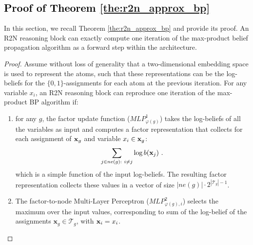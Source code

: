 \documentclass[journal]{IEEEtran}
\newcommand{\mc}{\mathcal}
\newcommand{\ar}[1]{\textcolor{black}{#1}}
\newenvironment{appxthm}[1]
  {\renewcommand\theinnercustomthm{#1}\innercustomthm}
  {\endinnercustomthm}
\begin{document}
\ar{\subsection*{Proof of Theorem \ref{the:r2n_approx_bp}}}

In this section, we recall Theorem \ref{the:r2n_approx_bp} and provide its proof.
\begin{appxthm}{1}
	An R2N reasoning block can exactly compute one iteration of the max-product belief propagation algorithm as a forward step within the architecture.
\end{appxthm}
\begin{proof} 
	Assume without loss of generality that a two-dimensional embedding space is used to represent the atoms, such that these representations can be the log-beliefs for the $\{0,1\}$-assignments for each atom at the previous iteration. %
	For any variable $x_i$, an R2N reasoning block can reproduce one iteration of the max-product BP algorithm if:
	\begin{enumerate}
	\item for any $g$,  the  factor update function  ($MLP^1_{\varphi(g)}$) takes the log-beliefs of all the variables as input and computes a factor representation that collects for each assignment of ${\bf x}_g$ and variable $x_i\in {\bf x}_g$:
	    \[
	    \sum_{j \in ne(g):\ i\neq j} \log b({\bf x}_j) \ .
	    \]
	    which is a simple function of the input log-beliefs.
	    The resulting factor representation collects these values in a vector of size $|ne(g)| \cdot 2^{|\mathcal{T}_g| - 1}$.

        \item The factor-to-node Multi-Layer Perceptron ($MLP^2_{\varphi(g),i}$) selects the maximum over the input values, corresponding to sum of the log-belief of the assignments $\mathbf{x}_g\in\mc T_g$, with ${\bf x}_i=x_i$.


\end{enumerate}
\end{proof}
\end{document}
